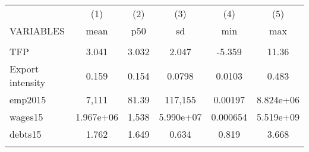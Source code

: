 \documentclass[]{article}
\begin{document}
\begin{tabular}{lccccc} \hline
 & (1) & (2) & (3) & (4) & (5) \\
VARIABLES & mean & p50 & sd & min & max \\ \hline
 &  &  &  &  &  \\
TFP & 3.041 & 3.032 & 2.047 & -5.359 & 11.36 \\
Export intensity & 0.159 & 0.154 & 0.0798 & 0.0103 & 0.483 \\
emp2015 & 7,111 & 81.39 & 117,155 & 0.00197 & 8.824e+06 \\
wages15 & 1.967e+06 & 1,538 & 5.990e+07 & 0.000654 & 5.519e+09 \\
debts15 & 1.762 & 1.649 & 0.634 & 0.819 & 3.668 \\
 &  &  &  &  &  \\ \hline
\end{tabular}
\end{document}
